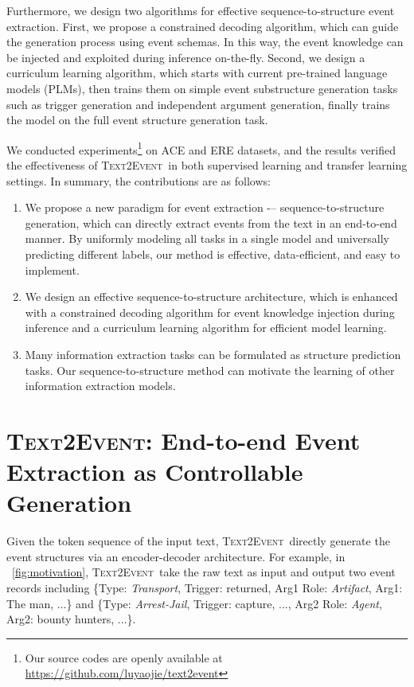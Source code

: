 \documentclass[11pt,a4paper]{article}
\newcommand\modelname{\textsc{Text2Event}}
\newcommand{\eventtpye}[1]{\textit{#1}}
\begin{document}
Furthermore, we design two algorithms for effective sequence-to-structure event extraction.
First, we propose a constrained decoding algorithm, which can guide the generation process using event schemas.
In this way, the event knowledge can be injected and exploited during inference on-the-fly.
Second, we design a curriculum learning algorithm, which starts with current pre-trained language models (PLMs), then trains them on simple event substructure generation tasks such as trigger generation and independent argument generation, finally trains the model on the full event structure generation task.

We conducted experiments\footnote{Our source codes are openly
available at \href{https://github.com/luyaojie/text2event}{https://github.com/luyaojie/text2event}} on ACE and ERE datasets, and the results verified the effectiveness of \modelname\, in both supervised learning and transfer learning settings.
In summary, the contributions are as follows:
\begin{enumerate}
    \item We propose a new paradigm for event extraction -– sequence-to-structure generation, which can directly extract events from the text in an end-to-end manner.
    By uniformly modeling all tasks in a single model and universally predicting different labels, our method is effective, data-efficient, and easy to implement.
    \item We design an effective sequence-to-structure architecture, which is enhanced with a constrained decoding algorithm for event knowledge injection during inference and a curriculum learning algorithm for efficient model learning.
    \item Many information extraction tasks can be formulated as structure prediction tasks. Our sequence-to-structure method can motivate the learning of other information extraction models.
\end{enumerate}
 
\section{\modelname: End-to-end Event Extraction as Controllable Generation} \label{sec:model}

Given the token sequence  of the input text, \modelname\, directly generate the event structures  via an encoder-decoder architecture.
For example, in \figurename~\ref{fig:motivation},  \modelname\, take the raw text as input and output two event records including \{Type: \eventtpye{Transport}, Trigger: returned, Arg1 Role: \eventtpye{Artifact}, Arg1: The man, ...\} and \{Type: \eventtpye{Arrest-Jail}, Trigger: capture, ..., Arg2 Role: \eventtpye{Agent}, Arg2: bounty hunters, ...\}.
\end{document}
